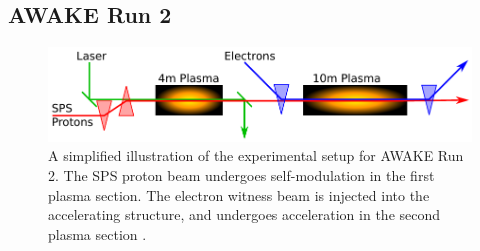 \documentclass[aps,prstab,reprint,amsmath,amssymb,groupedaddress]{revtex4-1}
\begin{document}


\subsection{AWAKE Run 2}\label{S:I:AWAKE}

\begin{figure}[hbt]
    \includegraphics[width=0.99\linewidth,trim={1mm 2mm 1mm 2mm},clip]{figures/figAWAKE}
    \caption{\label{Fig:AWAKER2} A simplified illustration of the experimental setup for AWAKE Run 2. The SPS proton
        beam undergoes self-modulation in the first plasma section. The electron witness beam is injected into the
        accelerating structure, and undergoes acceleration in the second plasma section
        \cite{berglyd_olsen:2015, adli:2016}.}
\end{figure}
\end{document}
